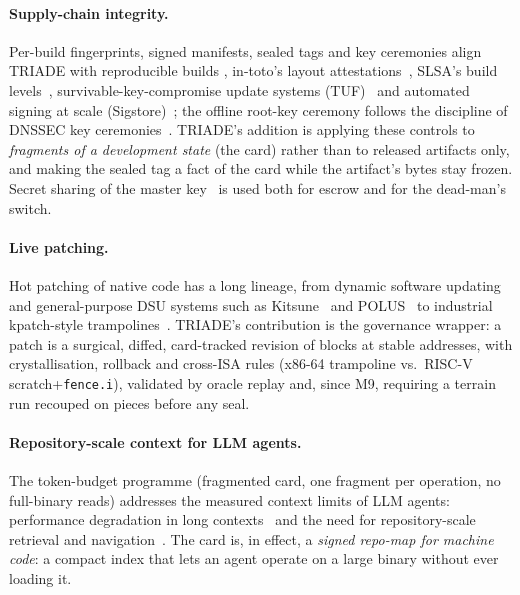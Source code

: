 \documentclass[11pt,a4paper]{article}
\newcommand{\code}[1]{\texttt{\small #1}}
\begin{document}
\paragraph{Supply-chain integrity.} Per-build fingerprints, signed
manifests, sealed tags and key ceremonies align TRIADE with
reproducible builds \cite{lamb2022}, in-toto's layout
attestations~\cite{intoto2019}, SLSA's build levels~\cite{slsa},
survivable-key-compromise update systems (TUF)~\cite{tuf2010} and
automated signing at scale (Sigstore)~\cite{sigstore2022}; the offline
root-key ceremony follows the discipline of DNSSEC key
ceremonies~\cite{rfc4033}. TRIADE's addition is applying these controls
to \emph{fragments of a development state} (the card) rather than to
released artifacts only, and making the sealed tag a fact of the card
while the artifact's bytes stay frozen. Secret sharing of the master
key~\cite{shamir1979} is used both for escrow and for the dead-man's
switch.

\paragraph{Live patching.} Hot patching of native code has a long
lineage, from dynamic software updating~\cite{hicks2002} and
general-purpose DSU systems such as Kitsune~\cite{hayden2012kitsune} and
POLUS~\cite{polusDSU} to industrial kpatch-style
trampolines~\cite{kpatch}. TRIADE's contribution is the
governance wrapper: a patch is a surgical, diffed, card-tracked revision
of blocks at stable addresses, with crystallisation, rollback and
cross-ISA rules (x86-64 trampoline vs.\ RISC-V scratch+\code{fence.i}),
validated by oracle replay and, since M9, requiring a terrain run
recouped on pieces before any seal.

\paragraph{Repository-scale context for LLM agents.} The token-budget
programme (fragmented card, one fragment per operation, no full-binary
reads) addresses the measured context limits of LLM agents: performance
degradation in long contexts~\cite{liu2024} and the need for
repository-scale retrieval and navigation~\cite{zhang2023, jimenez2024}.
The card is, in effect, a \emph{signed repo-map for machine code}: a
compact index that lets an agent operate on a large binary without ever
loading it.
\end{document}
